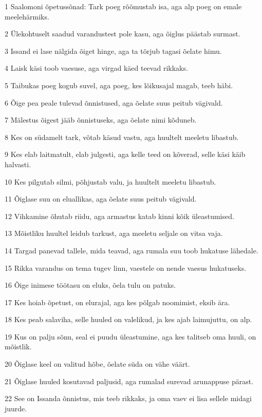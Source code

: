 \par 1 Saalomoni õpetussõnad: Tark poeg rõõmustab isa, aga alp poeg on emale meelehärmiks.
\par 2 Ülekohtuselt saadud varandustest pole kasu, aga õiglus päästab surmast.
\par 3 Issand ei lase nälgida õiget hinge, aga ta tõrjub tagasi õelate himu.
\par 4 Laisk käsi toob vaesuse, aga virgad käed teevad rikkaks.
\par 5 Taibukas poeg kogub suvel, aga poeg, kes lõikusajal magab, teeb häbi.
\par 6 Õige pea peale tulevad õnnistused, aga õelate suus peitub vägivald.
\par 7 Mälestus õigest jääb õnnistuseks, aga õelate nimi kõduneb.
\par 8 Kes on südamelt tark, võtab käsud vastu, aga huultelt meeletu libastub.
\par 9 Kes elab laitmatult, elab julgesti, aga kelle teed on kõverad, selle käsi käib halvasti.
\par 10 Kes pilgutab silmi, põhjustab valu, ja huultelt meeletu libastub.
\par 11 Õiglase suu on eluallikas, aga õelate suus peitub vägivald.
\par 12 Vihkamine õhutab riidu, aga armastus katab kinni kõik üleastumised.
\par 13 Mõistliku huultel leidub tarkust, aga meeletu seljale on vitsa vaja.
\par 14 Targad panevad tallele, mida teavad, aga rumala suu toob hukatuse lähedale.
\par 15 Rikka varandus on tema tugev linn, vaestele on nende vaesus hukatuseks.
\par 16 Õige inimese töötasu on eluks, õela tulu on patuks.
\par 17 Kes hoiab õpetust, on elurajal, aga kes põlgab noomimist, eksib ära.
\par 18 Kes peab salaviha, selle huuled on valelikud, ja kes ajab laimujuttu, on alp.
\par 19 Kus on palju sõnu, seal ei puudu üleastumine, aga kes talitseb oma huuli, on mõistlik.
\par 20 Õiglase keel on valitud hõbe, õelate süda on vähe väärt.
\par 21 Õiglase huuled kosutavad paljusid, aga rumalad surevad arunappuse pärast.
\par 22 See on Issanda õnnistus, mis teeb rikkaks, ja oma vaev ei lisa sellele midagi juurde.
